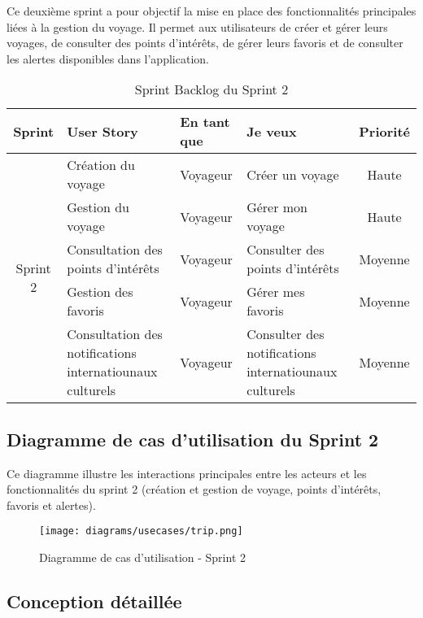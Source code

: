 Ce deuxième sprint a pour objectif la mise en place des fonctionnalités principales liées à la gestion du voyage. 
Il permet aux utilisateurs de créer et gérer leurs voyages, de consulter des points d’intérêts, de gérer leurs favoris 
et de consulter les alertes disponibles dans l’application.

\usepackage{multirow} %

\begin{table}[H]
\centering
\begin{tabular}{|c|l|l|l|c|}
\hline
\textbf{Sprint} & \textbf{User Story} & \textbf{En tant que} & \textbf{Je veux} & \textbf{Priorité} \\
\hline
\multirow{5}{*}{Sprint 2} & Création du voyage & Voyageur & Créer un voyage & Haute \\
\cline{2-5}
 & Gestion du voyage & Voyageur & Gérer mon voyage & Haute \\
\cline{2-5}
 & Consultation des points d'intérêts & Voyageur & Consulter des points d'intérêts & Moyenne \\
\cline{2-5}
 & Gestion des favoris & Voyageur & Gérer mes favoris & Moyenne \\
\cline{2-5}
 & Consultation des notifications internatiounaux culturels & Voyageur & Consulter des notifications internatiounaux culturels & Moyenne \\
\hline
\end{tabular}
\caption{Sprint Backlog du Sprint 2}
\end{table}


\subsection{Diagramme de cas d’utilisation du Sprint 2}

Ce diagramme illustre les interactions principales entre les acteurs et les fonctionnalités du sprint 2 
(création et gestion de voyage, points d’intérêts, favoris et alertes).

\begin{figure}[H]
    \centering
    \texttt{[image: diagrams/usecases/trip.png]}
    \caption{Diagramme de cas d'utilisation - Sprint 2}
\end{figure}

\subsection{Conception détaillée}

